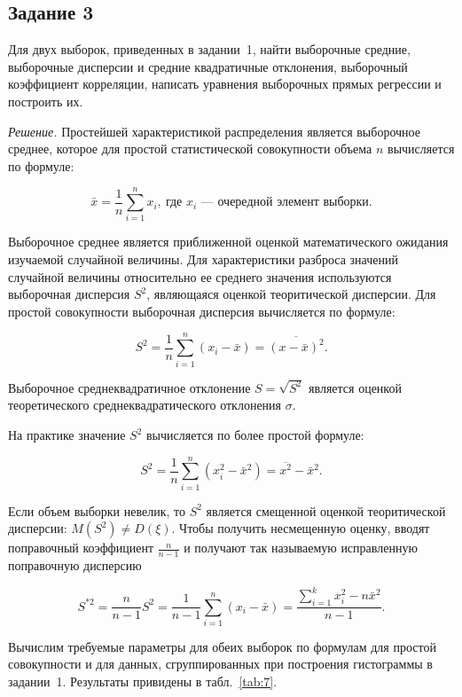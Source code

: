 










\subsection*{\hspace*{\parindent}Задание 3} 
Для двух выборок, приведенных в задании~1, найти выборочные средние, 
выборочные дисперсии и средние квадратичные отклонения, выборочный 
коэффициент корреляции, написать уравнения выборочных прямых 
регрессии и построить их.

\par
{\em Решение.}
Простейшей характеристикой распределения является выборочное среднее, 
которое для простой статистической совокупности объема $ n $ вычисляется 
по формуле:

$$  
  \bar{x} = \frac{1}{n} \sum_{i=1}^n x_i{,}\ \text{где } x_i \text{~--- очередной 
  элемент выборки.}
$$

Выборочное среднее является приближенной оценкой математического ожидания 
изучаемой случайной величины. Для характеристики разброса значений случайной 
величины относительно ее среднего значения используются выборочная дисперсия 
$ S^2 $, являющаяся оценкой теоритической дисперсии. Для простой совокупности 
выборочная дисперсия вычисляется по формуле:

$$  
	S^2 = \frac{1}{n} \sum_{i=1}^n {(x_i - \bar{x})} = \overline{(x - \bar{x})^2}. 
$$

Выборочное среднеквадратичное отклонение $ S = \sqrt{S^2} $ является 
оценкой теоретического среднеквадратического отклонения $ \sigma $.

На практике значение $ S^2 $ вычисляется по более простой формуле:

$$  
	S^2 = \frac{1}{n} \sum_{i=1}^n {(x_i^2 - \bar{x}^2)} = \overline{x^2} - 
	\bar{x}^2.
$$

Если объем выборки невелик, то $ S^2 $  является смещенной оценкой 
теоритической дисперсии: $ M(S^2) \neq D(\xi)$. Чтобы получить несмещенную 
оценку, вводят поправочный коэффициент $ \frac{n}{n-1} $ и получают так 
называемую исправленную поправочную дисперсию 

$$  
	S^{*2} = \frac{n}{n-1} S^2 = \frac{1}{n-1} \sum_{i=1}^n {(x_i - \bar{x})} = 
	\frac{\sum\limits_{i=1}^k {x_i^2 - n \bar{x}^2}}{n-1}. 
$$

Вычислим требуемые параметры для обеих выборок по формулам для простой 
совокупности и для данных, сгруппированных при построения гистограммы 
в задании~1. Результаты привидены в табл.~\ref{tab:7}.

